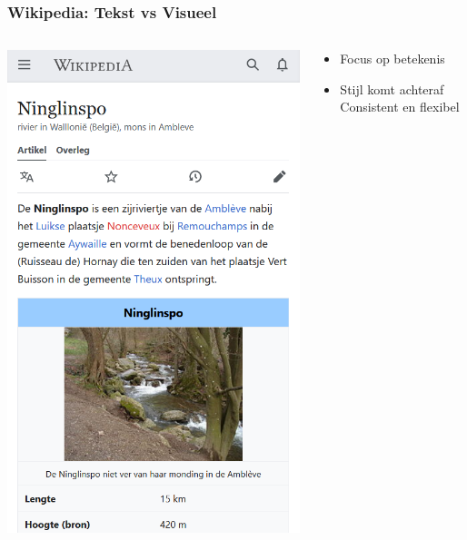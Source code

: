 \documentclass[../presentatie.tex]{subfiles}
\begin{document}
    \begin{frame}
        \frametitle{Wikipedia: Tekst vs Visueel}
        \begin{columns}
            \begin{column}{0.6\textwidth}
                \centering
                \includegraphics[width=\linewidth,height=0.7\textheight,keepaspectratio]{assets/wikipediaVisual}
            \end{column}
            \begin{column}{0.45\textwidth}
                \begin{itemize}
                    \item Focus op betekenis
                    \item Stijl komt achteraf \textrightarrow{} Consistent en flexibel
                \end{itemize}
            \end{column}
        \end{columns}
    \end{frame}
    
\end{document}

